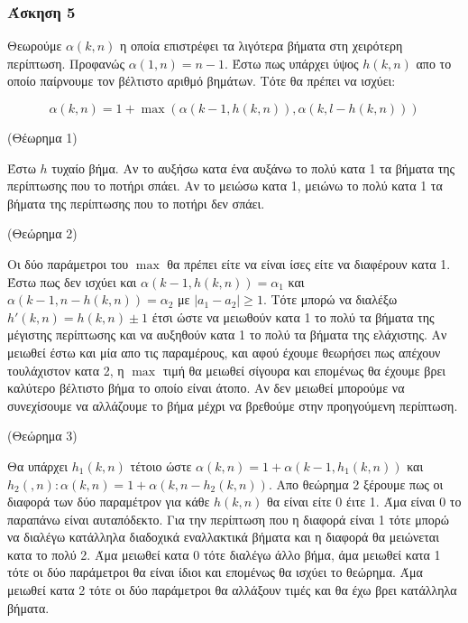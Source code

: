 \newpage
\subsubsection*{Άσκηση 5}

Θεωρούμε $\alpha(k,n)$ η οποία επιστρέφει τα λιγότερα βήματα στη χειρότερη περίπτωση.
Προφανώς $\alpha(1,n) = n-1$.
Έστω πως υπάρχει ύψος $h(k,n)$ απο το οποίο παίρνουμε τον βέλτιστο αριθμό βημάτων.
Τότε θα πρέπει να ισχύει:

\begin{equation*}
    \alpha(k,n) = 1 + \max(\alpha(k-1, h(k,n)), \alpha(k, l-h(k,n)) )
\end{equation*}

\begin{center}

\hfill

(Θέωρημα 1)

Έστω $h$ τυχαίο βήμα. Αν το αυξήσω κατα ένα αυξάνω το πολύ κατα 1 τα βήματα της περίπτωσης που το ποτήρι σπάει.
Αν το μειώσω κατα 1, μειώνω το πολύ κατα 1 τα βήματα της περίπτωσης που το ποτήρι δεν σπάει. 

\hfill

(Θεώρημα 2)

    Οι δύο παράμετροι του $\max$ θα πρέπει είτε να είναι ίσες είτε να διαφέρουν κατα 1. Έστω πως δεν ισχύει και $\alpha(k-1, h(k,n)) = \alpha_1$ και
    $\alpha(k-1, n-h(k,n)) = \alpha_2$ με $|a_1-a_2| \ge 1$. Tότε μπορώ να διαλέξω $h'(k,n) = h(k,n) \pm 1$ έτσι ώστε να μειωθούν κατα 1 το πολύ τα βήματα
    της μέγιστης περίπτωσης και να αυξηθούν κατα 1 το πολύ τα βήματα της ελάχιστης. Αν μειωθεί έστω και μία απο τις παραμέρους, και αφού έχουμε θεωρήσει πως απέχουν τουλάχιστον κατα 2, 
    η $\max$ τιμή θα μειωθεί σίγουρα και επομένως θα έχουμε βρει καλύτερο βέλτιστο βήμα το οποίο είναι άτοπο. Αν δεν μειωθεί μπορούμε να συνεχίσουμε να αλλάζουμε το βήμα μέχρι να βρεθούμε
    στην προηγούμενη περίπτωση.

\hfill

(Θεώρημα 3)

    Θα υπάρχει $h_1(k,n)$ τέτοιο ώστε $\alpha(k,n) = 1 + \alpha(k-1, h_1(k,n))$ και $h_2(,n): \alpha(k,n) = 1 + \alpha(k, n-h_2(k,n))$. Απο θεώρημα 2
    ξέρουμε πως οι διαφορά των δύο παραμέτρον για κάθε $h(k,n)$ θα είναι είτε 0 έιτε 1. Άμα είναι 0 
    το παραπάνω είναι αυταπόδεκτο. Για την περίπτωση που η διαφορά είναι 1 τότε μπορώ να διαλέγω κατάλληλα διαδοχικά εναλλακτικά βήματα και η διαφορά θα μειώνεται κατα το πολύ 2. 
    Άμα μειωθεί κατα 0 τότε διαλέγω άλλο βήμα, άμα μειωθεί κατα 1 τότε οι δύο παράμετροι θα είναι ίδιοι και επομένως θα ισχύει το θεώρημα. 
    Άμα μειωθεί κατα 2 τότε οι δύο παράμετροι θα αλλάξουν τιμές και θα έχω βρει κατάλληλα βήματα.



\end{center}
